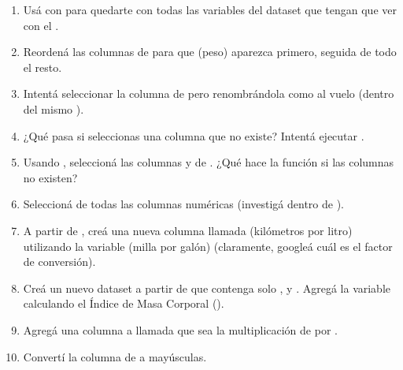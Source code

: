 \documentclass[8pt]{beamer}
\begin{document}
\begin{frame}[fragile]{}
\begin{enumerate}[start = 10]
		\item Us\'a  con  para quedarte con todas las variables del dataset  que tengan que ver con el  .
	
	\item Reorden\'a las columnas de  para que  (peso) aparezca primero, seguida de todo el resto.
	
	\item Intent\'a seleccionar la columna  de  pero renombrándola como  al vuelo (dentro del mismo ).
	
	\item ¿Qué pasa si seleccionas una columna que no existe? Intent\'a ejecutar .
	
	\item Usando , seleccion\'a las columnas  y  de . ¿Qué hace la función si las columnas no existen?
	
	\item Seleccion\'a de  todas las columnas numéricas (investig\'a  dentro de  ).
	
	\item A partir de , cre\'a una nueva columna llamada  (kilómetros por litro) utilizando la variable  (milla por galón) (claramente, google\'a cu\'al es el factor de conversi\'on).
	
	\item Cre\'a un nuevo dataset a partir de  que contenga solo ,  y . Agreg\'a la variable  calculando el Índice de Masa Corporal ().
	
	\item Agreg\'a una columna a  llamada  que sea la multiplicación de  por .
	
	\item Convert\'i la columna  de  a mayúsculas.
\end{enumerate}
\end{frame}
\end{document}
